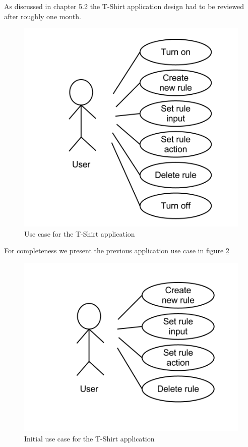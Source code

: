 As discussed in chapter 5.2 the T-Shirt application design had to be reviewed after roughly one month.

\begin{figure}[h!]
\centering \includegraphics[scale=0.35]{img/design-tshirtappusecase2}
\caption{Use case for the T-Shirt application}
\label{fig:design-tshirtappusecase2}
\end{figure}

For completeness we present the previous application use case in figure \ref{fig:design-tshirtappusecase1}

\begin{figure}[h!]
\centering \includegraphics[scale=0.35]{img/design-tshirtappusecase1}
\caption{Initial use case for the T-Shirt application}
\label{fig:design-tshirtappusecase1}
\end{figure}

